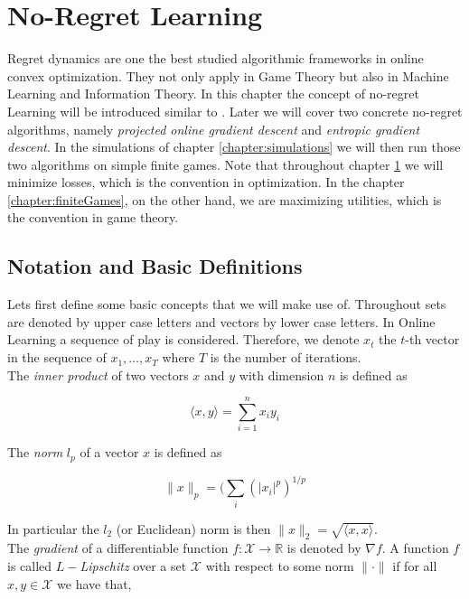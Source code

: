 
\chapter{No-Regret Learning}\label{chapter:noRegretLearning}

Regret dynamics are one the best studied algorithmic frameworks in online convex optimization. They not only apply in Game Theory but also in Machine Learning and Information Theory. In this chapter the concept of no-regret Learning will be introduced similar to \cite[Chapter 2]{HDRmertikopoulos}. Later we will cover two concrete no-regret algorithms, namely \textit{projected online gradient descent} and \textit{entropic gradient descent}. In the simulations of chapter \ref{chapter:simulations} we will then run those two algorithms on simple finite games. Note that throughout chapter \ref{chapter:noRegretLearning} we will minimize losses, which is the convention in optimization. In the chapter \ref{chapter:finiteGames}, on the other hand, we are maximizing utilities, which is the convention in game theory.


\section{Notation and Basic Definitions}\label{section:notationAndDefinitionsRegret}

Lets first define some basic concepts that we will make use of. Throughout sets are denoted by upper case letters and vectors by lower case letters. In Online Learning a sequence of play is considered. Therefore, we denote $x_t$ the $t$-th vector in the sequence of $x_1, \dots, x_T$ where $T$ is the number of iterations. \\
The \textit{inner product} of two vectors $x$ and $y$ with dimension $n$ is defined as 

\begin{equation*}
    \langle x,y\rangle = \sum_{i=1}^{n}x_i y_i
\end{equation*}

The \textit{norm} $l_p$ of a vector $x$ is defined as

\begin{equation*}
    \|x\|_p = (\sum_{i}(|x_i|^p)^{1/p}
\end{equation*}

In particular the $l_2$ (or Euclidean) norm is then $\|x\|_2 = \sqrt{\langle x,x\rangle}$. \\

The \textit{gradient} of a differentiable function $f: \mathcal{X} \to \mathbb{R}$ is denoted by $\nabla f$. A function $f$ is called $L-$\textit{Lipschitz} over a set $\mathcal{X}$ with respect to some norm $\|\cdot\|$ if for all $x,y \in \mathcal{X}$ we have that, 

